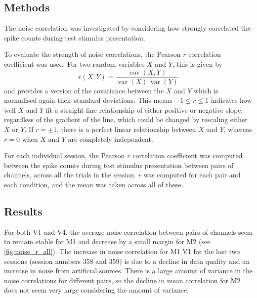 \subsection{Methods}
\label{sec:dec-meth-noise}

The noise correlation was investigated by considering how strongly correlated the spike counts during test stimulus presentation.

To evaluate the strength of noise correlations, the Pearson $r$ correlation coefficient was used.
For two random variables $X$ and $Y$, this is given by
\begin{equation}
r(X,Y) = \frac{\operatorname{cov}(X,Y)}{\operatorname{var}(X) \, \operatorname{var}(Y)}
\end{equation}
and provides a version of the covariance between the $X$ and $Y$ which is normalised again their standard deviations.
This means $-1 \le r \le 1$ indicates how well $X$ and $Y$ fit a straight line relationship of either positive or negative slope, regardless of the gradient of the line, which could be changed by rescaling either $X$ or $Y$.
If $r=\pm1$, there is a perfect linear relationship between $X$ and $Y$, whereas $r=0$ when $X$ and $Y$ are completely independent.

For each individual session, the Pearson $r$ correlation coefficient was computed between the spike counts during test stimulus presentation between pairs of channels, across all the trials in the session.
$r$ was computed for each pair and each condition, and the mean was taken across all of these.


\subsection{Results}

For both \ac{V1} and \ac{V4}, the average noise correlation between pairs of channels seem to remain stable for \ac{M1} and decrease by a small margin for \ac{M2} (see \autoref{fig:noise_r_all}).
The increase in noise correlation for \ac{M1} \ac{V1} for the last two sessions (session numbers 358 and 359) is due to a decline in data quality and an increase in noise from artificial sources.
There is a large amount of variance in the noise correlations for different pairs, so the decline in mean correlation for \ac{M2} does not seem very large considering the amount of variance.


